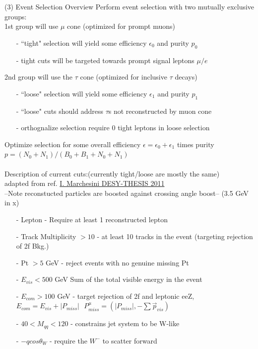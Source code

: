 \documentclass[10pt]{beamer}
\begin{document}
\begin{frame}{(3) Event Selection Overview}
Perform event selection with two mutually exclusive groups:\\
1st group will use $\mu$ cone (optimized for prompt muons)
	\begin{itemize}
		\scriptsize
		\item[-]``tight" selection will yield some efficiency $\epsilon_0$ and purity $p_0$
		\item[-] tight cuts will be targeted towards prompt signal leptons $\mu/e$ 
	\end{itemize} 
2nd group will use the $\tau$ cone (optimized for inclusive $\tau$ decays)
	\begin{itemize}
	\scriptsize
		\item[-] ``loose" selection will yield some efficiency $\epsilon_1$ and purity $p_1$
		\item[-] ``loose" cuts should address $\tau$s not reconstructed by muon cone
		\item[-] orthognalize selection require 0 tight leptons in loose selection
	\end{itemize}
Optimize selection for some overall efficiency $\epsilon = \epsilon_0 + \epsilon_1$ times purity $p = (N_0 + N_1) / (B_0 + B_1 + N_0 +N_1)$\\
\quad \quad \\
Description of current cuts:(currently tight/loose are mostly the same)\\
\tiny
adapted from ref. \url{I. Marchesini DESY-THESIS 2011}\\
\scriptsize
--Note reconstucted particles are boosted against crossing angle boost-- (3.5 GeV in x)\\
\begin{itemize}
\item[-]Lepton - Require at least 1 reconstructed lepton
\item[-]Track Multiplicity $> 10$ - at least 10 tracks in the event (targeting rejection of 2f Bkg.)
\item[-]Pt $> 5$ GeV - reject events with no genuine missing Pt 
\item[-]$E_{vis} < 500$ GeV Sum of the total visible energy in the event 
\item[-]$E_{com} > 100$ GeV - target rejection of 2f and leptonic eeZ, $E_{com} = E_{vis} + |P_{miss}| \, \,  \, \, P^\mu_{miss} = (|P_{miss}| , -\sum{\vec{p}_{vis}}) $
\item[-]$40<M_{qq}<120$ - constrains jet system to be W-like
\item[-] $-qcos\theta_W$ - require the $W^-$ to scatter forward

\end{itemize}


	
	

\end{frame}
\end{document}
